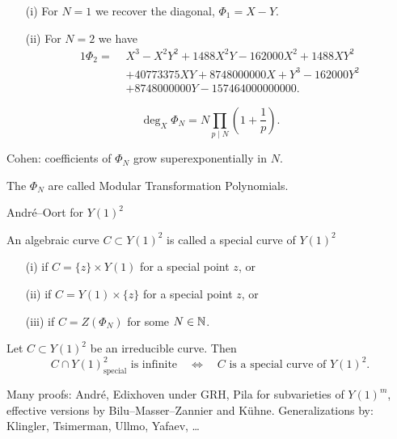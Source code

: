\documentclass{beamer}
\begin{document}
\begin{frame}
  \begin{example}
    \begin{enumerate}
    \item [(i)]    For $N=1$ we recover the diagonal, 
      $\Phi_1 = X-Y$.
    \item[(ii)] For $N=2$ we have   
      \begin{alignat*}1
        \Phi_2 = 
        \,\,&X^3 - X^2Y^2 + 1488X^2Y - 162000X^2 + 1488XY^2 \\
        &+ 40773375XY +
        8748000000X +Y^3 - 162000Y^2 \\
        &+ 8748000000Y -157464000000000.    
      \end{alignat*}
    \end{enumerate}
  \end{example}
  \vspace{-0.5cm}
  \begin{equation*}
    \deg_X \Phi_N = N\prod_{p\mid N}\left(1+\frac 1p\right). 
  \end{equation*}
 
  Cohen: coefficients of $\Phi_N$ grow superexponentially in $N$.
  
  \begin{definition}
    The $\Phi_N$ are called \alert{Modular Transformation Polynomials}.
  \end{definition}
\end{frame}

\begin{frame}{Andr\'e--Oort for $Y(1)^2$}
  \begin{definition}
    An algebraic curve  $C\subset Y(1)^2$ is called a \alert{special curve} of
    $Y(1)^2$ 
    \begin{enumerate}
    \item [(i)] if $C = \{z\}\times Y(1)$ for a special point $z$, or
    \item [(ii)] if $C =  Y(1)\times \{z\}$ for a special point $z$, or
    \item[(iii)] if $C=Z(\Phi_N)$ for some $N\in{\mathbb{N}}$. 
    \end{enumerate}
  \end{definition}

  \begin{theorem}
    Let $C\subset Y(1)^2$ be an irreducible curve. Then
    \begin{equation*}
      C \cap Y(1)^2_{\mathrm{special}}\text{ is
        infinite}\quad\Longleftrightarrow\quad \text{$C$ is a special
        curve of $Y(1)^2$}. 
    \end{equation*}  
  \end{theorem}

  \vspace{-0.25cm}
  Many proofs: Andr\'e, Edixhoven under GRH, Pila for subvarieties of
  $Y(1)^m$, effective versions by Bilu--Masser--Zannier and K\"uhne.
  Generalizations by: Klingler, Tsimerman, Ullmo, Yafaev, \ldots
\end{frame}
\end{document}
